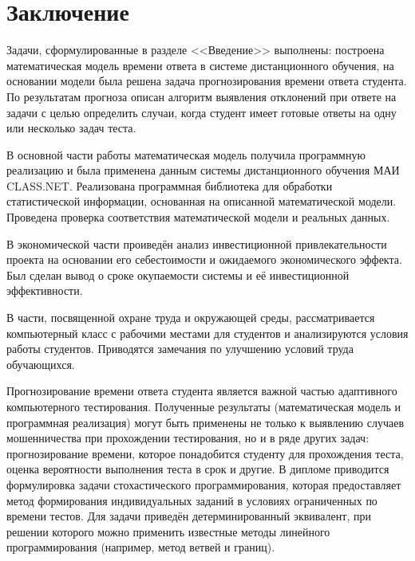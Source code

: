 \chapter*{Заключение} 

Задачи, сформулированные в разделе <<Введение>> выполнены: построена математическая модель времени ответа в системе дистанционного обучения, на основании модели была решена задача прогнозирования времени ответа студента. По результатам прогноза описан алгоритм выявления откло\-нений при ответе на задачи с целью определить случаи, когда  студент имеет готовые ответы на одну или несколько задач теста.

В основной части работы математическая модель получила программную реализацию и была при\-менена данным системы дистанционного обучения МАИ CLASS.NET. Реа\-лизована программная библиотека для обработки ста\-тистической информа\-ции, основанная на описанной математической модели. Проведена проверка соответствия математической модели и реальных дан\-ных.

В экономической части проиведён анализ инвестиционной привлекатель\-ности проекта на основании его себестоимости и ожидаемого экономического эффекта. Был сделан вывод о сроке окупаемости системы и её инвестиционной эффективности.

В части, посвященной охране труда и окружающей среды, рассматри\-вается компьютерный класс с рабочими местами для студентов и анализи\-руются условия работы студентов. Приводятся замечания по улучшению ус\-ловий труда обучающихся.

Прогнозирование времени ответа студента является важной частью адап\-тивного компьютерного тестирования. Полученные результаты (математиче\-ская модель и программная реализация) могут быть применены не только к выявлению случаев мошенничества при прохождении тестирования, но и в ряде других задач: прогнозирование времени, которое понадобится студенту для прохождения теста, оценка вероятности выполнения теста в срок и другие. В дипломе приводится формулировка задачи стохастического программи\-рования, которая предоставляет метод формирования индивидуальных за\-даний в условиях ограниченных по времени тестов. Для задачи приведён детерминированный эквивалент, при решении которого можно применить известные методы линейного программирования (например, метод ветвей и границ).

